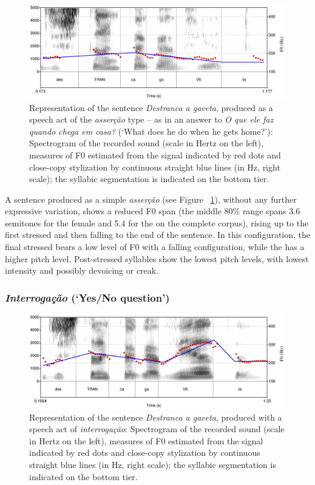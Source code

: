 \documentclass[output=paper]{LSP/langsci}
\begin{document}
\begin{figure}

\includegraphics[width=0.99\textwidth]{figures/MOR3.eps}
\caption{Representation of the sentence \textit{Destranca a gaveta}, produced as a speech act of  the \textit{asserção} type -- as in an answer to \textit{O que ele faz quando chega em casa?} (`What does he do when he gets home?'): Spectrogram of the recorded sound (scale in Hertz on the left), measures of F0 estimated from the signal indicated by red dots and close-copy stylization by continuous straight blue lines (in Hz, right scale); the syllabic segmentation is indicated on the bottom tier.}
\label{figure:CC1}
\end{figure}

A sentence produced as a simple  \textit{asserção} (see Figure ~\ref{figure:CC1}), without any further expressive variation, shows a reduced F0 span (the middle 80\% range spans 3.6 semitones for the female and 5.4 for the  on the complete corpus), rising up to the first stressed  and then falling to the end of the sentence. 
In this configuration, the final stressed  bears a low level of F0 with a falling configuration, while the  has a higher pitch level. 
Post-stressed syllables show the lowest pitch levels, with lowest intensity and possibly devoicing or creak.


\subsubsection{\textit{Interrogação} (`Yes/No question')}

\begin{figure}

\includegraphics[width=0.99\textwidth]{figures/MOR4.eps}
\caption{Representation of the sentence \textit{Destranca a gaveta}, produced with a speech act of \textit{interrogação}: Spectrogram of the recorded sound (scale in Hertz on the left), measures of F0 estimated from the signal indicated by red dots and close-copy stylization by continuous straight blue lines (in Hz, right scale); the syllabic segmentation is indicated on the bottom tier.}
\label{figure:CC2}
\end{figure}
\end{document}
